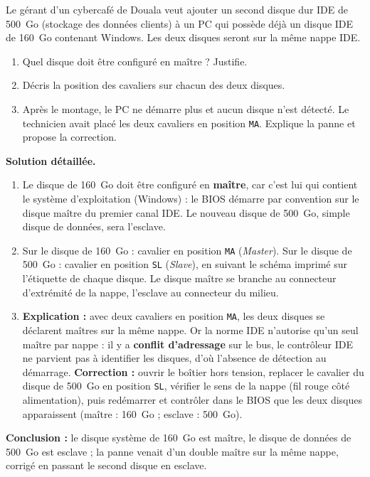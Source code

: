 \documentclass[11pt]{article}
\begin{document}
\begin{exoresolu}
Le gérant d'un cybercafé de Douala veut ajouter un second disque dur IDE de \SI{500}{Go} (stockage des données clients) à un PC qui possède déjà un disque IDE de \SI{160}{Go} contenant Windows. Les deux disques seront sur la même nappe IDE.
\begin{enumerate}
\item Quel disque doit être configuré en maître ? Justifie.
\item Décris la position des cavaliers sur chacun des deux disques.
\item Après le montage, le PC ne démarre plus et aucun disque n'est détecté. Le technicien avait placé les deux cavaliers en position \texttt{MA}. Explique la panne et propose la correction.
\end{enumerate}
\tcblower
\textbf{Solution détaillée.}
\begin{enumerate}
\item Le disque de \SI{160}{Go} doit être configuré en \textbf{maître}, car c'est lui qui contient le système d'exploitation (Windows) : le BIOS démarre par convention sur le disque maître du premier canal IDE. Le nouveau disque de \SI{500}{Go}, simple disque de données, sera l'esclave.
\item Sur le disque de \SI{160}{Go} : cavalier en position \texttt{MA} (\emph{Master}). Sur le disque de \SI{500}{Go} : cavalier en position \texttt{SL} (\emph{Slave}), en suivant le schéma imprimé sur l'étiquette de chaque disque. Le disque maître se branche au connecteur d'extrémité de la nappe, l'esclave au connecteur du milieu.
\item \textbf{Explication :} avec deux cavaliers en position \texttt{MA}, les deux disques se déclarent maîtres sur la même nappe. Or la norme IDE n'autorise qu'un seul maître par nappe : il y a \textbf{conflit d'adressage} sur le bus, le contrôleur IDE ne parvient pas à identifier les disques, d'où l'absence de détection au démarrage.
\textbf{Correction :} ouvrir le boîtier hors tension, replacer le cavalier du disque de \SI{500}{Go} en position \texttt{SL}, vérifier le sens de la nappe (fil rouge côté alimentation), puis redémarrer et contrôler dans le BIOS que les deux disques apparaissent (maître : \SI{160}{Go} ; esclave : \SI{500}{Go}).
\end{enumerate}
\textbf{Conclusion :} le disque système de \SI{160}{Go} est maître, le disque de données de \SI{500}{Go} est esclave ; la panne venait d'un double maître sur la même nappe, corrigé en passant le second disque en esclave.
\end{exoresolu}
\end{document}
